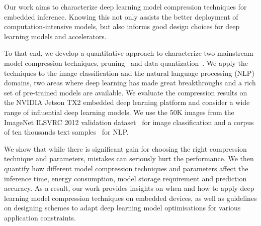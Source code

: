 Our work aims to characterize deep learning model compression techniques for embedded inference. Knowing this not only assists the better
deployment of computation-intensive models, but also informs good design choices for deep learning models and accelerators.

To that end, we develop a quantitative approach  to characterize two mainstream model compression techniques, pruning~\cite{Cheng2017A} and
data quantization~\cite{Gong2014Compressing}. We apply the techniques to the image classification and the natural language processing (NLP)
domains, two areas where deep learning has made great breakthroughs and a rich set of pre-trained models are available. We evaluate the
compression results on the NVIDIA Jetson TX2 embedded deep learning platform and consider a wide range of influential deep learning models.
We use the 50K images from the ImageNet ILSVRC 2012 validation dataset~\cite{imagenet2012} for image classification and a corpus of ten
thousands text samples~\cite{acl2016} for NLP.


We show that while there is significant gain for choosing the right compression technique and parameters, mistakes can seriously hurt the
performance. We then quantify how different model compression techniques and parameters affect the inference time, energy consumption,
model storage requirement and prediction accuracy. As a result, our work provides insights on when and how to apply deep learning model
compression techniques on embedded devices, as well as guidelines on designing schemes to adapt deep learning model optimisations for
various application constraints.

